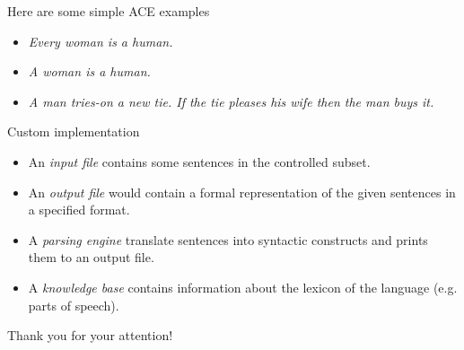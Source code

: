 \documentclass{beamer}
\begin{document}
\begin{frame}
Here are some simple ACE examples
\begin{itemize}
\item \textit{Every woman is a human.}
\item \textit{A woman is a human.}
\item \textit{A man tries-on a new tie. If the tie pleases his wife then the man buys it.}
\end{itemize}
\end{frame}

\begin{frame}{Custom implementation}
\end{frame}

\begin{frame}
\begin{itemize}
\item An \textit{input file} contains some sentences in the controlled subset.
\item An \textit{output file} would contain a formal representation of the given sentences in a specified format. 
\item A \textit{parsing engine} translate sentences into syntactic constructs and prints them to an output file.
\item A \textit{knowledge base} contains information about the lexicon of the language (e.g. parts of speech).
\end{itemize}
\end{frame}

\begin{frame}
\begin{center}
\huge Thank you for your attention!
\end{center}

\end{frame}
\end{document}
